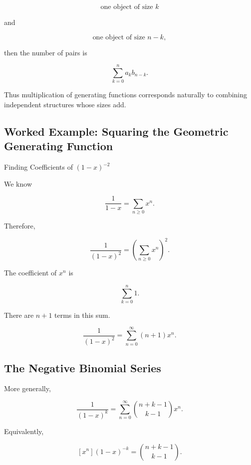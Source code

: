 \[
\text{one object of size }k
\]

and

\[
\text{one object of size }n-k,
\]

then the number of pairs is

\[
\sum_{k=0}^{n}a_kb_{n-k}.
\]

Thus multiplication of generating functions corresponds naturally to
combining independent structures whose sizes add.

\subsection{Worked Example: Squaring the Geometric Generating Function}
\label{subsec:worked-geometric-square}

\begin{workedexamplebox}{Finding Coefficients of \((1-x)^{-2}\)}

We know

\[
\frac{1}{1-x}
=
\sum_{n\geq0}x^n.
\]

Therefore,

\[
\frac{1}{(1-x)^2}
=
\left(
\sum_{n\geq0}x^n
\right)^2.
\]

The coefficient of \(x^n\) is

\[
\sum_{k=0}^{n}1.
\]

There are \(n+1\) terms in this sum.

\begin{answerbox}
\[
\boxed{
\frac{1}{(1-x)^2}
=
\sum_{n=0}^{\infty}(n+1)x^n.
}
\]
\end{answerbox}

\end{workedexamplebox}

\subsection{The Negative Binomial Series}
\label{subsec:negative-binomial-series}

More generally,

\[
\boxed{
\frac{1}{(1-x)^k}
=
\sum_{n=0}^{\infty}
\binom{n+k-1}{k-1}x^n.
}
\]

Equivalently,

\[
\boxed{
[x^n](1-x)^{-k}
=
\binom{n+k-1}{k-1}.
}
\]


